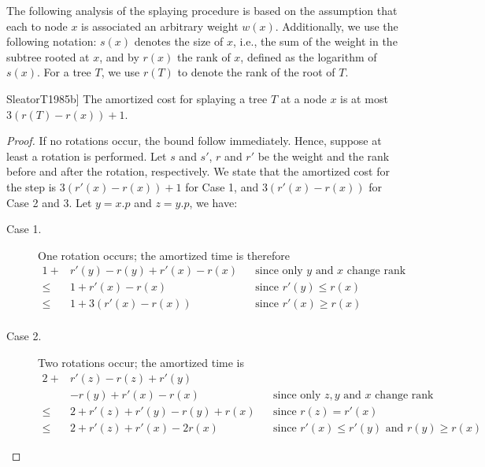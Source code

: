 \documentclass{subfiles}
\begin{document}
    The following analysis of the splaying procedure is based on the assumption that each to node 
        \(x\) is associated an arbitrary weight \(w(x)\). Additionally, we use the following notation:
        \(s(x)\) denotes the size of \(x\), i.e., the sum of the weight in the subtree rooted at \(x\),
        and by \(r(x)\) the rank of \(x\), defined as the logarithm of \(s(x)\).
        For a tree \(T\), we use \(r(T)\) to denote the rank of the root of \(T\).


    \begin{theorem*}[\cite[Lemma 1]{SleatorT1985b}]
        The amortized cost for splaying a tree \(T\) at a node \(x\) is at most \(3(r(T) - r(x)) + 1\).
    \end{theorem*}
    \begin{proof}
        If no rotations occur, the bound follow immediately.
            Hence, suppose at least a rotation is performed. Let \(s\) and \(s'\),
            \(r\) and \(r'\) be the weight and the rank before and after the rotation, respectively.
            We state that the amortized cost for the step is \(3(r'(x) - r(x)) + 1\) for Case 1,
            and \(3(r'(x) - r(x))\) for Case 2 and 3. Let \(y = x.p\) and \(z = y.p\), we have:
            \begin{description}
                \item [Case 1. ] One rotation occurs; the amortized time is therefore
                    \[\begin{aligned}
                        1 + & r'(y) - r(y) + r'(x) - r(x) && \text{since only \(y\) and \(x\) change rank} \\ 
                        \le & 1 + r'(x) - r(x) && \text{since \(r'(y) \le r(x)\)} \\ 
                        \le & 1 + 3(r'(x) - r(x)) && \text{since \(r'(x) \ge r(x)\)} \\ 
                    \end{aligned}\]

                \item [Case 2.] Two rotations occur; the amortized time is
                    \[\begin{aligned}
                        2 + & r'(z) - r(z) + r'(y) && \\ 
                        & - r(y) + r'(x) - r(x) && \text{since only \(z, y\) and \(x\) change rank} \\ 
                        \le & 2 + r'(z) + r'(y) - r(y) + r(x) && \text{since \(r(z) = r'(x)\)} \\
                        \le & 2 + r'(z) + r'(x) - 2r(x) && \text{since \(r'(x) \le r'(y)\) and \(r(y) \ge r(x)\)} 
                    \end{aligned}\]


\end{description}
\end{proof}
\end{document}
